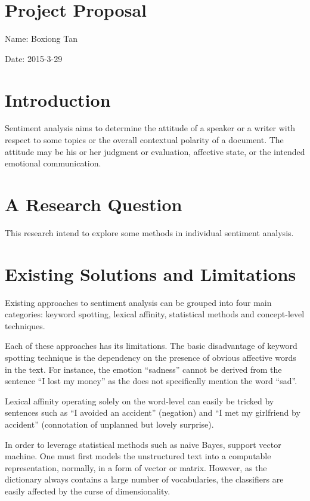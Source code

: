 \documentclass{article}
\begin{document}
\section*{Project Proposal}

\begin{flushleft}Name: Boxiong Tan \end{flushleft} %
\begin{flushleft}Date: 2015-3-29\end{flushleft}
\section*{Introduction} %
Sentiment analysis aims to determine the attitude of a speaker or a writer with respect to some topics or the overall contextual polarity of a document. The attitude may be his or her judgment or evaluation, affective state, or the intended emotional communication.

\section*{A Research Question}
This research intend to explore some methods in individual sentiment analysis.
\section*{Existing Solutions and Limitations}
Existing approaches to sentiment analysis can be grouped into four main categories: keyword spotting, lexical affinity, statistical methods and concept-level techniques.

Each of these approaches has its limitations. The basic disadvantage of keyword spotting technique is the dependency on the presence of obvious affective words in the text. For instance, the emotion “sadness” cannot be derived from the sentence “I lost my money” as the does not specifically mention the word “sad”.

Lexical affinity operating solely on the word-level can easily be tricked by sentences such as “I avoided an accident” (negation) and “I met my girlfriend by accident” (connotation of unplanned but lovely surprise).

In order to leverage statistical methods such as naive Bayes, support vector machine. One must first models the unstructured text into a 
computable representation, normally, in a form of vector or matrix. However, as the dictionary always contains a large number of vocabularies, 
the classifiers are easily affected by the curse of dimensionality.
\end{document}
